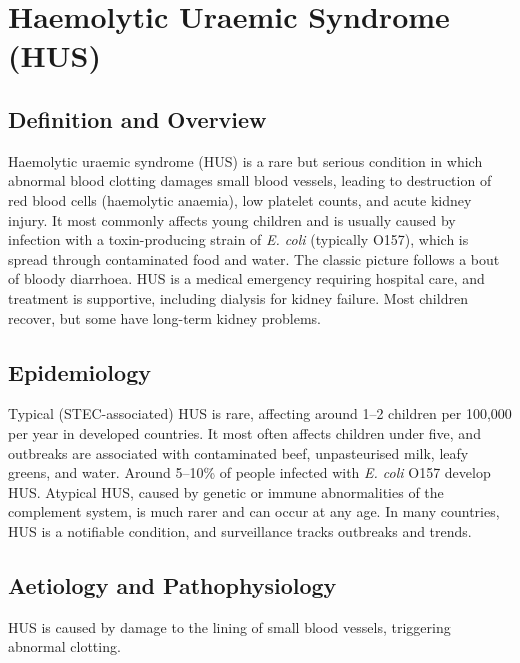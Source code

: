 \chapter{Haemolytic Uraemic Syndrome (HUS)}

\section*{Definition and Overview}
Haemolytic uraemic syndrome (HUS) is a rare but serious condition in which abnormal blood clotting damages small blood vessels, leading to destruction of red blood cells (haemolytic anaemia), low platelet counts, and acute kidney injury. It most commonly affects young children and is usually caused by infection with a toxin-producing strain of \textit{E. coli} (typically O157), which is spread through contaminated food and water. The classic picture follows a bout of bloody diarrhoea. HUS is a medical emergency requiring hospital care, and treatment is supportive, including dialysis for kidney failure. Most children recover, but some have long-term kidney problems.

\section*{Epidemiology}
Typical (STEC-associated) HUS is rare, affecting around 1--2 children per 100,000 per year in developed countries. It most often affects children under five, and outbreaks are associated with contaminated beef, unpasteurised milk, leafy greens, and water. Around 5--10\% of people infected with \textit{E. coli} O157 develop HUS. Atypical HUS, caused by genetic or immune abnormalities of the complement system, is much rarer and can occur at any age. In many countries, HUS is a notifiable condition, and surveillance tracks outbreaks and trends.

\section*{Aetiology and Pathophysiology}
HUS is caused by damage to the lining of small blood vessels, triggering abnormal clotting.

